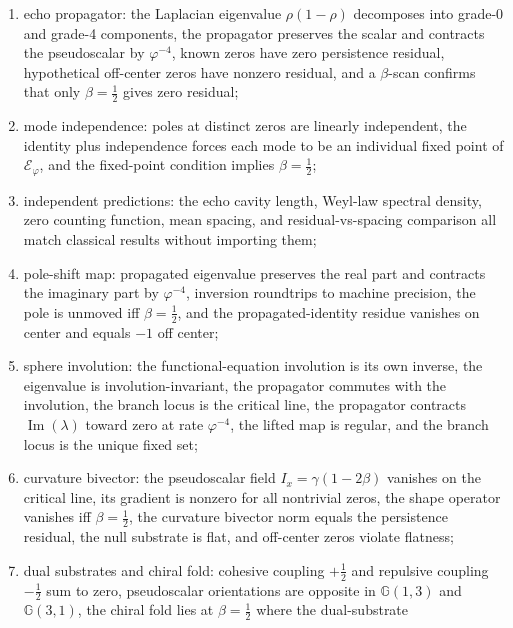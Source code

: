 \documentclass[11pt,a4paper]{article}
\theoremstyle{plain}
\theoremstyle{definition}
\theoremstyle{remark}
\numberwithin{equation}{section}
\newcommand{\Cl}{\mathbb{G}}
\newcommand{\vp}{\varphi}
\begin{document}
\begin{enumerate}
    multiplication, irreducible echo counts are primes, unique
    factorization holds, the Euler product matches the Dirichlet
    series, and the full emergence chain composes;
  \item echo propagator: the Laplacian eigenvalue \(\rho(1-\rho)\)
    decomposes into grade-0 and grade-4 components, the propagator
    preserves the scalar and contracts the pseudoscalar by
    \(\vp^{-4}\), known zeros have zero persistence residual,
    hypothetical off-center zeros have nonzero residual, and a
    \(\beta\)-scan confirms that only \(\beta=\tfrac12\) gives zero
    residual;
  \item mode independence: poles at distinct zeros are linearly
    independent, the identity plus independence forces each mode to be
    an individual fixed point of \(\mathcal{E}_\vp\), and the
    fixed-point condition implies \(\beta=\tfrac12\);
  \item independent predictions: the echo cavity length, Weyl-law
    spectral density, zero counting function, mean spacing, and
    residual-vs-spacing comparison all match classical results
    without importing them;
  \item pole-shift map: propagated eigenvalue preserves the real part
    and contracts the imaginary part by \(\vp^{-4}\), inversion
    roundtrips to machine precision, the pole is unmoved iff
    \(\beta=\tfrac12\), and the propagated-identity residue vanishes
    on center and equals \(-1\) off center;
  \item sphere involution: the functional-equation involution is its
    own inverse, the eigenvalue is involution-invariant, the propagator
    commutes with the involution, the branch locus is the critical line,
    the propagator contracts \(\operatorname{Im}(\lambda)\) toward
    zero at rate \(\vp^{-4}\), the lifted map is regular, and the
    branch locus is the unique fixed set;
  \item curvature bivector: the pseudoscalar field \(I_x=\gamma(1-2\beta)\)
    vanishes on the critical line, its gradient is nonzero for all
    nontrivial zeros, the shape operator vanishes iff \(\beta=\tfrac12\),
    the curvature bivector norm equals the persistence residual,
    the null substrate is flat, and off-center zeros violate flatness;
  \item dual substrates and chiral fold: cohesive coupling \(+\tfrac12\)
    and repulsive coupling \(-\tfrac12\) sum to zero, pseudoscalar
    orientations are opposite in \(\Cl(1,3)\) and \(\Cl(3,1)\),
    the chiral fold lies at \(\beta=\tfrac12\) where the dual-substrate

\end{enumerate}
\end{document}
